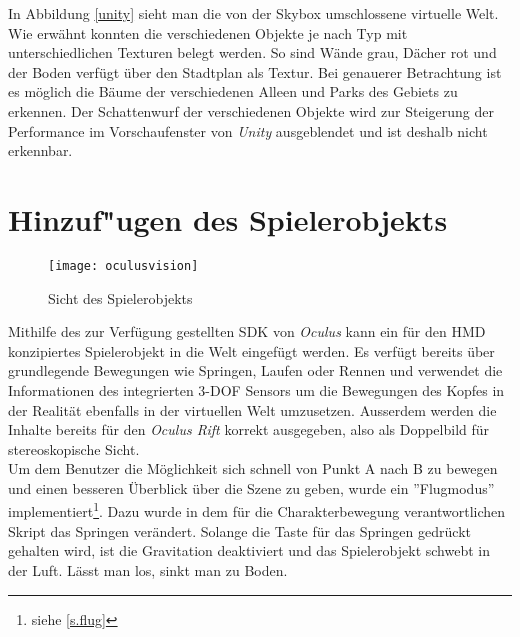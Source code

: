 In Abbildung \ref{unity} sieht man die von der Skybox umschlossene virtuelle Welt. Wie erwähnt konnten die verschiedenen Objekte je nach Typ mit unterschiedlichen Texturen belegt werden. So sind Wände grau, Dächer rot und der Boden verfügt über den Stadtplan als Textur. Bei genauerer Betrachtung ist es möglich die Bäume der verschiedenen Alleen und Parks des Gebiets zu erkennen. Der Schattenwurf der verschiedenen Objekte wird zur Steigerung der Performance im Vorschaufenster von \textit{Unity} ausgeblendet und ist deshalb nicht erkennbar. 
\newpage
\section{Hinzuf"ugen des Spielerobjekts}\label{s.ovr}
\begin{wrapfigure}{r}{0.5\textwidth}
	\vspace{-20pt}
	\begin{center}
		\texttt{[image: oculusvision]}
	\end{center}
	\vspace{-15pt}
	\caption{Sicht des Spielerobjekts}\label{oculusvision}
	\vspace{-12pt}
\end{wrapfigure}
Mithilfe des zur Verfügung gestellten SDK von \textit{Oculus} kann ein für den HMD konzipiertes Spielerobjekt in die Welt eingefügt werden. Es verfügt bereits über grundlegende Bewegungen wie Springen, Laufen oder Rennen und verwendet die Informationen des integrierten 3-DOF Sensors um die Bewegungen des Kopfes in der Realität ebenfalls in der virtuellen Welt umzusetzen. Ausserdem werden die Inhalte bereits für den \textit{Oculus Rift} korrekt ausgegeben, also als Doppelbild für stereoskopische Sicht.\\[6pt]
Um dem Benutzer die Möglichkeit sich schnell von Punkt A nach B zu bewegen und einen besseren Überblick über die Szene zu geben, wurde ein ''Flugmodus'' implementiert\footnote{siehe \ref{s.flug}}. Dazu wurde in dem für die Charakterbewegung verantwortlichen Skript das Springen verändert. Solange die Taste für das Springen gedrückt gehalten wird, ist die Gravitation deaktiviert und das Spielerobjekt schwebt in der Luft. Lässt man los, sinkt man zu Boden.

